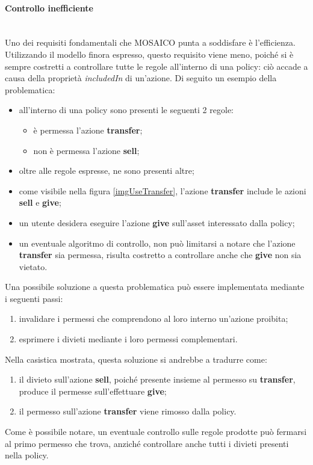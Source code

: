 \documentclass[12pt,a4paper,twoside]{book}
\begin{document}
\paragraph{Controllo inefficiente}\mbox{}\\
Uno dei requisiti fondamentali che MOSAICO punta a soddisfare è l'efficienza. Utilizzando il modello finora espresso, questo requisito viene meno, poiché si è sempre costretti a controllare tutte le regole all'interno di una policy: ciò accade a causa della proprietà \textit{includedIn} di un'azione. Di seguito un esempio della problematica:
\begin{itemize}
\item all'interno di una policy sono presenti le seguenti 2 regole:
\begin{itemize}
\item è permessa l'azione \textbf{transfer};
\item non è permessa l'azione \textbf{sell};
\end{itemize}
\item oltre alle regole espresse, ne sono presenti altre;
\item come visibile nella figura \ref{imgUseTransfer}, l'azione \textbf{transfer} include le azioni \textbf{sell} e \textbf{give}; 
\item un utente desidera eseguire l'azione \textbf{give} sull'asset interessato dalla policy;
\item un eventuale algoritmo di controllo, non può limitarsi a notare che l'azione \textbf{transfer} sia permessa, risulta costretto a controllare anche che \textbf{give} non sia vietato.
\end{itemize}
Una possibile soluzione a questa problematica può essere implementata mediante i seguenti passi:
\begin{enumerate}
\item invalidare i permessi che comprendono al loro interno un'azione proibita;
\item esprimere i divieti mediante i loro permessi complementari.
\end{enumerate}
Nella casistica mostrata, questa soluzione si andrebbe a tradurre come:
\begin{enumerate}
\item il divieto sull'azione \textbf{sell}, poiché presente insieme al permesso su \textbf{transfer}, produce il permesse sull'effettuare \textbf{give};
\item il permesso sull'azione \textbf{transfer} viene rimosso dalla policy.
\end{enumerate}
Come è possibile notare, un eventuale controllo sulle regole prodotte può fermarsi al primo permesso che trova, anziché controllare anche tutti i divieti presenti nella policy.
\end{document}
